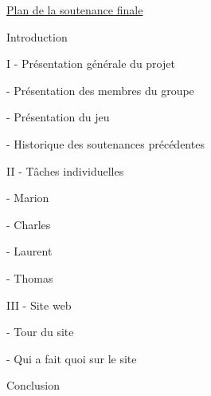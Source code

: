 \documentclass[a4paper]{article}
\begin{document}
\pagestyle{fancy}


\Large

\begin{center}

\underline{Plan de la soutenance finale}

\end{center}

\quad

Introduction

\quad
\quad

I - Présentation générale du projet

\quad

	- Présentation des membres du groupe


	- Présentation du jeu


	- Historique des soutenances précédentes



\quad
\quad


II  -  Tâches individuelles

\quad

	- Marion

	- Charles

	- Laurent

	- Thomas


\quad
\quad

III - Site web

\quad

	- Tour du site

	- Qui a fait quoi sur le site


\quad
\quad


Conclusion 
\end{document}
